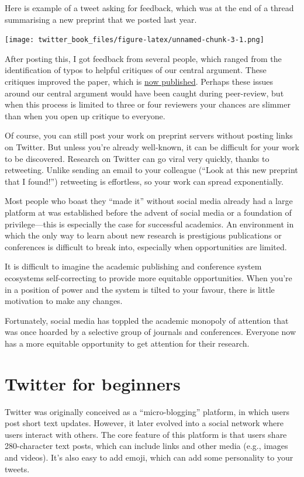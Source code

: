 \documentclass[
]{book}
\begin{document}
Here is example of a tweet asking for feedback, which was at the end of a thread summarising a new preprint that we posted last year.

\texttt{[image: twitter\_book\_files/figure-latex/unnamed-chunk-3-1.png]}

After posting this, I got feedback from several people, which ranged from the identification of typos to helpful critiques of our central argument. These critiques improved the paper, which is \href{https://pubmed.ncbi.nlm.nih.gov/32360118/}{now published}. Perhaps these issues around our central argument would have been caught during peer-review, but when this process is limited to three or four reviewers your chances are slimmer than when you open up critique to everyone.

Of course, you can still post your work on preprint servers without posting links on Twitter. But unless you're already well-known, it can be difficult for your work to be discovered. Research on Twitter can go viral very quickly, thanks to retweeting. Unlike sending an email to your colleague (``Look at this new preprint that I found!'') retweeting is effortless, so your work can spread exponentially.

Most people who boast they ``made it'' without social media already had a large platform at was established before the advent of social media or a foundation of privilege---this is especially the case for successful academics. An environment in which the only way to learn about new research is prestigious publications or conferences is difficult to break into, especially when opportunities are limited.

It is difficult to imagine the academic publishing and conference system ecosystems self-correcting to provide more equitable opportunities. When you're in a position of power and the system is tilted to your favour, there is little motivation to make any changes.

Fortunately, social media has toppled the academic monopoly of attention that was once hoarded by a selective group of journals and conferences. Everyone now has a more equitable opportunity to get attention for their research.

\hypertarget{beginner}{%
\chapter{Twitter for beginners}\label{beginner}}

Twitter was originally conceived as a ``micro-blogging'' platform, in which users post short text updates. However, it later evolved into a social network where users interact with others. The core feature of this platform is that users share 280-character text posts, which can include links and other media (e.g., images and videos). It's also easy to add emoji, which can add some personality to your tweets.
\end{document}

